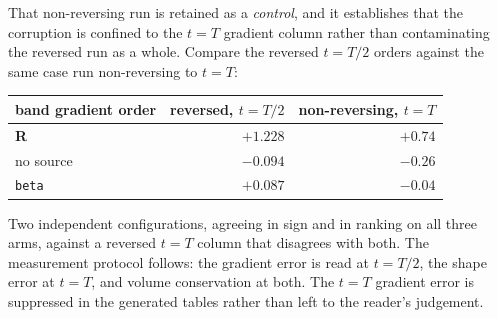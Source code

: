 \documentclass[preprint,3p,11pt]{elsarticle}
\begin{document}
That non-reversing run is retained as a \emph{control}, and it establishes that
the corruption is confined to the $t=T$ gradient column rather than
contaminating the reversed run as a whole. Compare the reversed $t=T/2$ orders
against the same case run non-reversing to $t=T$:
\begin{center}
\begin{tabular}{lrr}
\toprule
band gradient order & reversed, $t=T/2$ & non-reversing, $t=T$ \\
\midrule
\textbf{R}    & $+1.228$ & $+0.74$ \\
no source     & $-0.094$ & $-0.26$ \\
\texttt{beta} & $+0.087$ & $-0.04$ \\
\bottomrule
\end{tabular}
\end{center}
Two independent configurations, agreeing in sign and in ranking on all three
arms, against a reversed $t=T$ column that disagrees with both. The measurement
protocol follows: the gradient error is read at $t=T/2$, the shape error at
$t=T$, and volume conservation at both. The $t=T$ gradient error is suppressed
in the generated tables rather than left to the reader's judgement.
\end{document}
